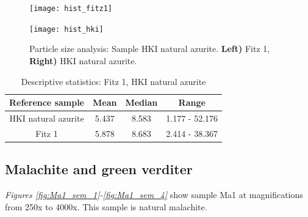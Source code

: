 \begin{figure}[H]
\centering
\begin{minipage}{.45\textwidth}
  \centering
  \texttt{[image: hist\_fitz1]}
\end{minipage}
\begin{minipage}{.45\textwidth}
  \centering
  \texttt{[image: hist\_hki]}
\end{minipage}
\caption[Particle size analysis: Sample HKI natural azurite]{Particle size analysis: Sample HKI natural azurite. \textbf{Left)} Fitz 1, \textbf{Right)} HKI natural azurite.}
\label{fig:histogram_length}
\end{figure}

\begin{table}[H]
\caption{Descriptive statistics: Fitz 1, HKI natural azurite}
\centering
\label{table:r_stats}
\begin{tabular}{c c c c}
\toprule
Reference sample & Mean & Median & Range \\
\midrule
HKI natural azurite & 5.437 & 8.583 & 1.177 - 52.176 \\
Fitz 1 & 5.878 & 8.683 & 2.414 - 38.367 \\
\bottomrule
\end{tabular}
\end{table}



\subsection[Malachite and green verditer]{Malachite and green verditer}
\label{subsection3.1.2}


\textit{Figures \ref{fig:Ma1_sem_1}-\ref{fig:Ma1_sem_4}} show sample Ma1 at magnifications from 250x to 4000x. This sample is natural malachite.

